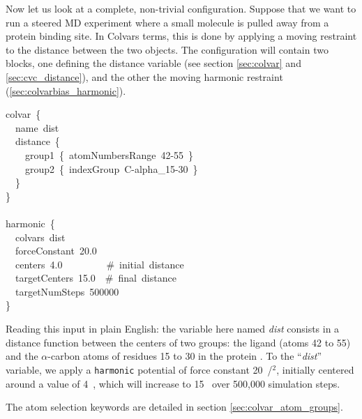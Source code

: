 Now let us look at a complete, non-trivial configuration.
Suppose that we want to run a steered MD experiment where a small molecule is pulled away from a protein binding site.
In Colvars terms, this is done by applying a moving restraint to the distance between the two objects.
The configuration will contain two blocks, one defining the distance variable (see section \ref{sec:colvar} and \ref{sec:cvc_distance}), and the other the moving harmonic restraint (\ref{sec:colvarbias_harmonic}).

\begin{cvexampleinput}

colvar~\{\\
\-~~name~dist\\
\-~~distance~\{\\
\-~~~~group1~\{~atomNumbersRange~42-55~\}\\
\-~~~~group2~\{~indexGroup~C-alpha\_15-30~\}\\
\-~~\}\\
\-\}\\
\-\\
\-harmonic~\{\\
\-~~colvars~dist\\
\-~~forceConstant~20.0\\
\-~~centers~4.0~~~~~~~~~\#~initial~distance\\
\-~~targetCenters~15.0~~\#~final~distance\\
\-~~targetNumSteps~500000\\
\}
\end{cvexampleinput}

Reading this input in plain English: the variable here named \emph{dist} consists in a distance function between the centers of two groups: the ligand (atoms 42 to 55) and the $\alpha$-carbon atoms of residues 15 to 30 in the protein .
To the ``\emph{dist}'' variable, we apply a \texttt{harmonic} potential of force constant 20~\energyunit/\lengthunit$^2$, initially centered around a value of 4~\lengthunit, which will increase to 15~\lengthunit{} over 500,000 simulation steps.

The atom selection keywords are detailed in section \ref{sec:colvar_atom_groups}.


